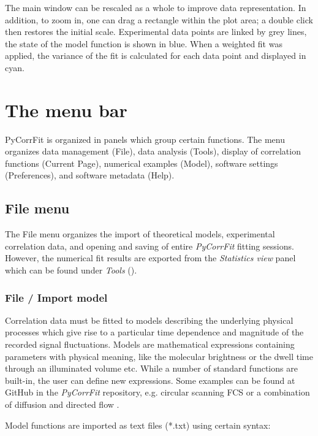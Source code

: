The main window can be rescaled as a whole to improve data representation. In addition, to zoom in, one can drag a rectangle within the plot area; a double click then restores the initial scale. Experimental data points are linked by grey lines, the state of the model function is shown in blue. When a weighted fit was applied, the variance of the fit is calculated for each data point and displayed in cyan.

\section{The menu bar}
\label{sec:mb}

PyCorrFit is organized in panels which group certain functions. The menu organizes data management (File), data analysis (Tools), display of correlation functions (Current Page), numerical examples (Model), software settings (Preferences), and software metadata (Help).

\subsection{File menu}
\label{sec:fm}
The File menu organizes the import of theoretical models, experimental correlation data, and opening and saving of entire \textit{PyCorrFit} fitting sessions. However, the numerical fit results are exported from the \textit{Statistics view} panel which can be found under \textit{Tools} ().

\subsubsection{File / Import model}
\label{sec:fm.im}
Correlation data must be fitted to models describing the underlying physical processes which give rise to a particular time dependence and magnitude of the recorded signal fluctuations. Models are mathematical expressions containing parameters with physical meaning, like the molecular brightness or the dwell time through an illuminated volume etc. While a number of standard functions are built-in, the user can define new expressions. Some examples can be found at GitHub in the \textit{PyCorrFit} repository, e.g. circular scanning FCS \cite{Petrasek2008} or a combination of diffusion and directed flow \cite{Brinkmeier1999}.

Model functions are imported as text files (*.txt) using certain syntax:

